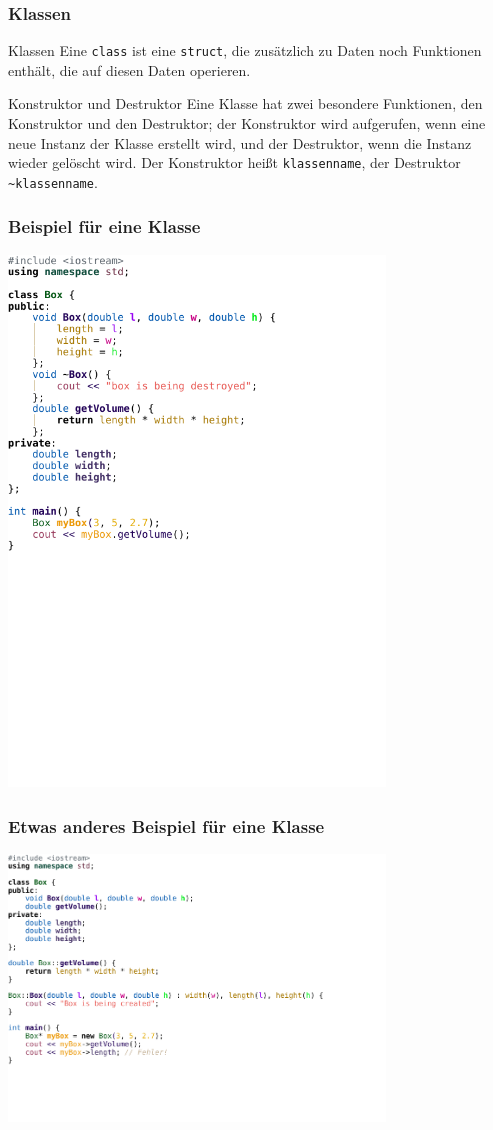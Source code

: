 \documentclass[18pt]{beamer}
\begin{document}
\begin{frame}
    \frametitle{Klassen}
    \begin{block}{Klassen}
    Eine \texttt{class} ist eine \texttt{struct}, die zusätzlich zu Daten noch Funktionen enthält, die auf diesen Daten operieren.
    \end{block}
    \begin{block}{Konstruktor und Destruktor}
    Eine Klasse hat zwei besondere Funktionen, den Konstruktor und den Destruktor; der Konstruktor wird aufgerufen, wenn eine neue Instanz der Klasse erstellt wird, und der Destruktor, wenn die Instanz wieder gelöscht wird. Der Konstruktor heißt \texttt{klassenname}, der Destruktor \texttt{\~{}klassenname}.
    \end{block}
\end{frame}
\begin{frame}
    \frametitle{Beispiel für eine Klasse}
    \vspace{0.7cm}
    \includegraphics[width=10cm]{example_code/box2.pdf}
\end{frame}
\begin{frame}
    \frametitle{Etwas anderes Beispiel für eine Klasse}
    \vspace{0.7cm}
    \includegraphics[width=10cm]{example_code/box3.pdf}
\end{frame}

\end{document}
